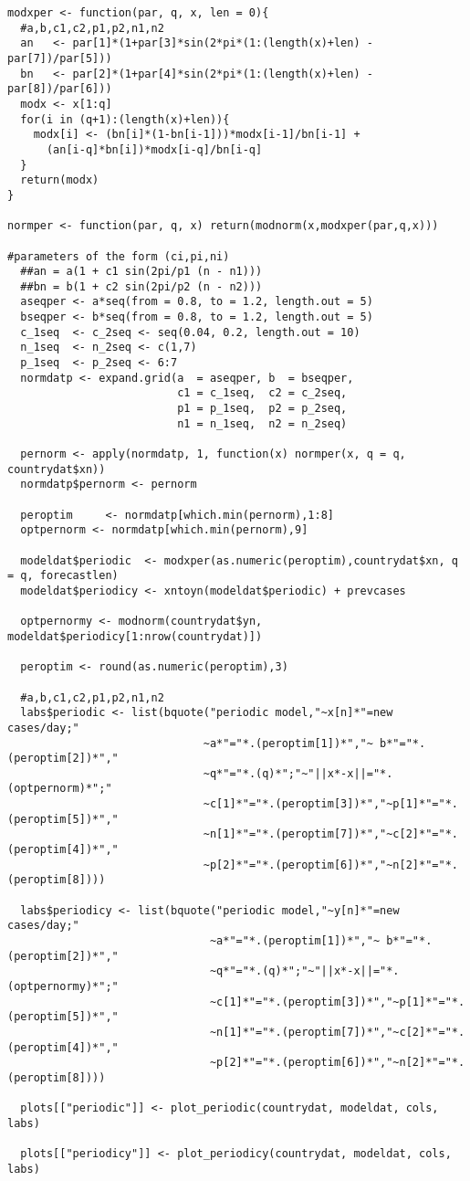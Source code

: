 \begin{lstlisting}[frame=single, caption = {Algorithm for Periodic Model}]
modxper <- function(par, q, x, len = 0){
  #a,b,c1,c2,p1,p2,n1,n2
  an   <- par[1]*(1+par[3]*sin(2*pi*(1:(length(x)+len) - par[7])/par[5]))
  bn   <- par[2]*(1+par[4]*sin(2*pi*(1:(length(x)+len) - par[8])/par[6]))
  modx <- x[1:q]
  for(i in (q+1):(length(x)+len)){
    modx[i] <- (bn[i]*(1-bn[i-1]))*modx[i-1]/bn[i-1] +
      (an[i-q]*bn[i])*modx[i-q]/bn[i-q]
  }
  return(modx)
}

normper <- function(par, q, x) return(modnorm(x,modxper(par,q,x)))

#parameters of the form (ci,pi,ni)
  ##an = a(1 + c1 sin(2pi/p1 (n - n1)))
  ##bn = b(1 + c2 sin(2pi/p2 (n - n2)))
  aseqper <- a*seq(from = 0.8, to = 1.2, length.out = 5)
  bseqper <- b*seq(from = 0.8, to = 1.2, length.out = 5)
  c_1seq  <- c_2seq <- seq(0.04, 0.2, length.out = 10)
  n_1seq  <- n_2seq <- c(1,7)
  p_1seq  <- p_2seq <- 6:7
  normdatp <- expand.grid(a  = aseqper, b  = bseqper,
                          c1 = c_1seq,  c2 = c_2seq,
                          p1 = p_1seq,  p2 = p_2seq,
                          n1 = n_1seq,  n2 = n_2seq)
  
  pernorm <- apply(normdatp, 1, function(x) normper(x, q = q, countrydat$xn))
  normdatp$pernorm <- pernorm
  
  peroptim     <- normdatp[which.min(pernorm),1:8]
  optpernorm <- normdatp[which.min(pernorm),9]
  
  modeldat$periodic  <- modxper(as.numeric(peroptim),countrydat$xn, q = q, forecastlen)
  modeldat$periodicy <- xntoyn(modeldat$periodic) + prevcases
  
  optpernormy <- modnorm(countrydat$yn, modeldat$periodicy[1:nrow(countrydat)])
  
  peroptim <- round(as.numeric(peroptim),3)
   
  #a,b,c1,c2,p1,p2,n1,n2
  labs$periodic <- list(bquote("periodic model,"~x[n]*"=new cases/day;"
                              ~a*"="*.(peroptim[1])*","~ b*"="*.(peroptim[2])*","
                              ~q*"="*.(q)*";"~"||x*-x||="*.(optpernorm)*";"
                              ~c[1]*"="*.(peroptim[3])*","~p[1]*"="*.(peroptim[5])*","
                              ~n[1]*"="*.(peroptim[7])*","~c[2]*"="*.(peroptim[4])*","
                              ~p[2]*"="*.(peroptim[6])*","~n[2]*"="*.(peroptim[8])))
  
  labs$periodicy <- list(bquote("periodic model,"~y[n]*"=new cases/day;"
                               ~a*"="*.(peroptim[1])*","~ b*"="*.(peroptim[2])*","
                               ~q*"="*.(q)*";"~"||x*-x||="*.(optpernormy)*";"
                               ~c[1]*"="*.(peroptim[3])*","~p[1]*"="*.(peroptim[5])*","
                               ~n[1]*"="*.(peroptim[7])*","~c[2]*"="*.(peroptim[4])*","
                               ~p[2]*"="*.(peroptim[6])*","~n[2]*"="*.(peroptim[8])))
  
  plots[["periodic"]] <- plot_periodic(countrydat, modeldat, cols, labs)
  
  plots[["periodicy"]] <- plot_periodicy(countrydat, modeldat, cols, labs)

\end{lstlisting}

